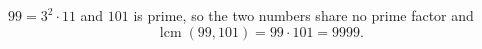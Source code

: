 $99=3^2\cdot11$ and $101$ is prime, so the two numbers share no prime factor and
\[\operatorname{lcm}(99,101)=99\cdot101=\boxed{9999}.\]
